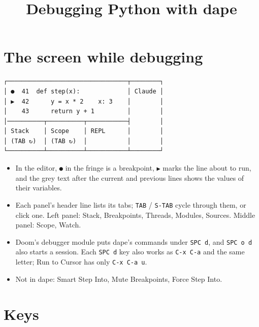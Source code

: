 \documentclass[11pt]{article}
\date{}
\title{Debugging Python with dape}
\begin{document}
\maketitle
\section{The screen while debugging}
\label{sec:org35d0cca}

\begin{verbatim}
┌─────────────────────────────────┬────────┐
│ ●  41  def step(x):             │ Claude │
│ ▶  42      y = x * 2    x: 3    │        │
│    43      return y + 1         │        │
│──────────┬──────────┬───────────┤        │
│ Stack    │ Scope    │ REPL      │        │
│ (TAB ↻)  │ (TAB ↻)  │           │        │
└──────────┴──────────┴───────────┴────────┘
\end{verbatim}

\begin{itemize}
\item In the editor, \texttt{●} in the fringe is a breakpoint, \texttt{▶} marks the line about
to run, and the grey text after the current and previous lines shows the
values of their variables.
\item Each panel's header line lists its tabs; \texttt{TAB} / \texttt{S-TAB} cycle through them,
or click one.  Left panel: Stack, Breakpoints, Threads, Modules, Sources.
Middle panel: Scope, Watch.
\item Doom's debugger module puts dape's commands under \texttt{SPC d}, and \texttt{SPC o d} also starts a session.  Each \texttt{SPC d} key also works as \texttt{C-x C-a} and the same letter; Run to Cursor has only \texttt{C-x C-a u}.
\item Not in dape: Smart Step Into, Mute Breakpoints, Force Step Into.
\end{itemize}
\section{Keys}
\label{sec:orgf85dedf}
\end{document}
